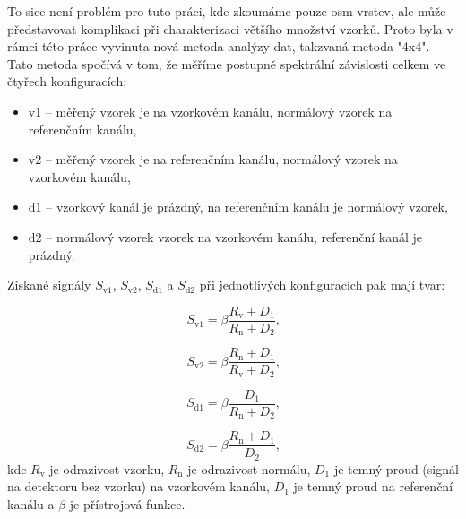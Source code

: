 To sice není problém pro tuto práci, kde zkoumáme pouze osm vrstev, ale může představovat komplikaci při charakterizaci většího množství vzorků. Proto byla v rámci této práce vyvinuta nová metoda analýzy dat, takzvaná metoda "4x4". Tato metoda spočívá v tom, že měříme postupně spektrální závislosti celkem ve čtyřech konfiguracích:
\begin{itemize}
  \item v1 -- měřený vzorek je na vzorkovém kanálu, normálový vzorek na referenčním kanálu,
  \item v2 -- měřený vzorek je na referenčním kanálu, normálový vzorek na vzorkovém kanálu,
  \item d1 -- vzorkový kanál je prázdný, na referenčním kanálu je normálový vzorek,
  \item d2 -- normálový vzorek vzorek na vzorkovém kanálu, referenční kanál je prázdný.
\end{itemize}

Získané signály $S_\mathrm{v1}$, $S_\mathrm{v2}$, $S_\mathrm{d1}$ a $S_\mathrm{d2}$ při jednotlivých konfiguracích pak mají tvar:

\begin{equation}
S_\mathrm{v1} = \beta \frac{R_\mathrm{v} + D_1}{R_\mathrm{n} + D_2} \text{,}
\end{equation}

\begin{equation}
S_\mathrm{v2} = \beta \frac{R_\mathrm{n} + D_1}{R_\mathrm{v} + D_2} \text{,}
\end{equation}

\begin{equation}
S_\mathrm{d1} = \beta \frac{D_1}{R_\mathrm{n} + D_2} \text{,}
\end{equation}

\begin{equation}
S_\mathrm{d2} = \beta \frac{R_\mathrm{n} + D_1}{D_2} \text{,}
\end{equation}
kde $R_\mathrm{v}$ je odrazivost vzorku, $R_\mathrm{n}$ je odrazivost normálu, $D_1$ je temný proud (signál na detektoru bez vzorku) na vzorkovém kanálu, $D_1$ je temný proud na referenční kanálu a $\beta$ je přístrojová funkce. 

